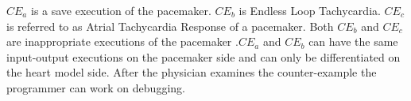 $CE_a$ is a save execution of the pacemaker. $CE_b$ is Endless Loop Tachycardia. $CE_c$ is referred to as Atrial Tachycardia Response of a pacemaker. Both $CE_b$ and $CE_c$ are inappropriate executions of the pacemaker .$CE_a$ and $CE_b$ can have the same input-output executions on the pacemaker side and can only be differentiated on the heart model side. After the physician examines the counter-example the programmer can work on debugging.
%
 




